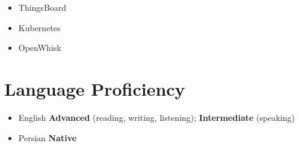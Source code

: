 \documentclass[11pt,a4paper,roman]{moderncv} %
\newcommand*{\authorimg}[1]{%
	\raisebox{-.3\baselineskip}{%
		\texttt{[image: \#1]}%
	}%
}
\begin{document}
\begin{cvcolumns}
	 {\begin{itemize}
	 		\vspace{0.1em}
	 		\setlength\itemsep{0.3em}
	 		\item \authorimg{pictures/thingsboard.png} ThingsBoard
	 		\item \authorimg{pictures/kubernetes.png} Kubernetes
	 		\item \authorimg{pictures/openwhisk.jpg} OpenWhisk
	 \end{itemize}}
\end{cvcolumns}

\section{Language Proficiency}

\begin{itemize}
	\item English \hspace{6 pt} \textbf{Advanced} (reading, writing, listening); \textbf{Intermediate} (speaking)
	
	\item Persian \hspace{6 pt} \textbf{Native}
\end{itemize} 
\end{document}
